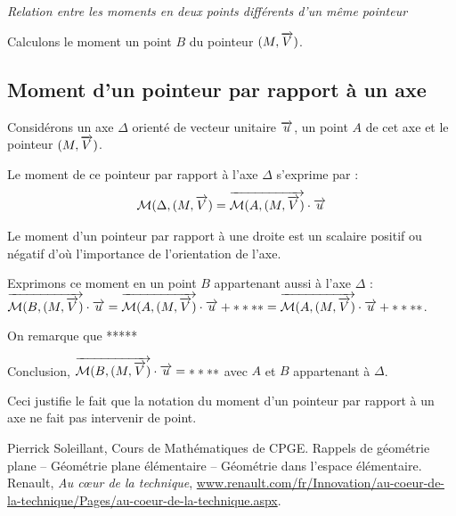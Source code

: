 \documentclass[10pt,oneside]{article}
\begin{document}
\begin{rem}
\textit{Relation entre les moments en deux points différents d'un même pointeur}

Calculons le moment un point $B$ du pointeur $(M,\overrightarrow{V})$. 
\end{rem}


\subsection{Moment d'un pointeur par rapport à un axe}
\begin{defi}
\begin{minipage}[c]{.47\linewidth}
Considérons un axe $\Delta$ orienté de vecteur unitaire $\overrightarrow{u}$, un point $A$ de cet axe et le pointeur $(M,\overrightarrow{V})$. 

Le moment de ce pointeur par rapport à l'axe $\Delta$ s'exprime par :
$$
\mathcal{M}(\Delta,(M,\overrightarrow{V}) =
\overrightarrow{\mathcal{M}(A,(M,\overrightarrow{V})}\cdot \overrightarrow{u}
$$
\end{minipage}\hfill
\begin{minipage}[c]{.47\linewidth}

\end{minipage}
\end{defi}

Le moment d'un pointeur par rapport à une droite est un scalaire positif ou négatif d'où l'importance de l'orientation de l'axe. 

\begin{props}
Exprimons ce moment en un point $B$ appartenant aussi à l'axe $\Delta$ :
$\overrightarrow{\mathcal{M}(B,(M,\overrightarrow{V})}\cdot \overrightarrow{u} = \overrightarrow{\mathcal{M}(A,(M,\overrightarrow{V})}\cdot \overrightarrow{u} +****
=\overrightarrow{\mathcal{M}(A,(M,\overrightarrow{V})}\cdot \overrightarrow{u} + ****$.

On remarque que *****

Conclusion, $\overrightarrow{\mathcal{M}(B,(M,\overrightarrow{V})}\cdot \overrightarrow{u} = ****$ avec $A$ et $B$ appartenant à $\Delta$.

Ceci justifie le fait que la notation du moment d'un pointeur par rapport à un axe ne fait pas intervenir de point. 

\end{props}


\begin{thebibliography}{2}
 Pierrick Soleillant, Cours de Mathématiques de CPGE. Rappels de géométrie plane -- Géométrie plane élémentaire -- Géométrie dans l'espace élémentaire.
    Renault, \textit{Au c\oe{}ur de la technique}, \url{www.renault.com/fr/Innovation/au-coeur-de-la-technique/Pages/au-coeur-de-la-technique.aspx}.
\end{thebibliography}
\end{document}
